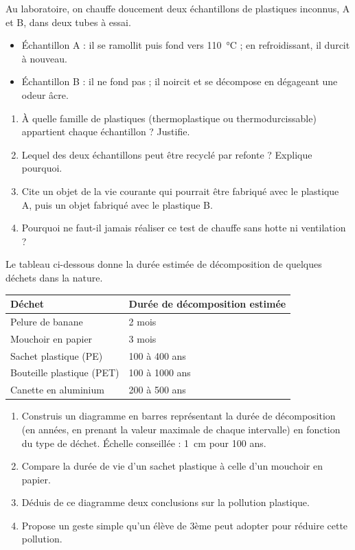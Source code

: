 \documentclass[11pt]{article}
\begin{document}
\begin{exercice}
Au laboratoire, on chauffe doucement deux échantillons de plastiques inconnus, A et B, dans deux tubes à essai.
\begin{itemize}
\item Échantillon A : il se ramollit puis fond vers \SI{110}{\celsius} ; en refroidissant, il durcit à nouveau.
\item Échantillon B : il ne fond pas ; il noircit et se décompose en dégageant une odeur âcre.
\end{itemize}
\begin{enumerate}
\item À quelle famille de plastiques (thermoplastique ou thermodurcissable) appartient chaque échantillon ? Justifie.
\item Lequel des deux échantillons peut être recyclé par refonte ? Explique pourquoi.
\item Cite un objet de la vie courante qui pourrait être fabriqué avec le plastique A, puis un objet fabriqué avec le plastique B.
\item Pourquoi ne faut-il jamais réaliser ce test de chauffe sans hotte ni ventilation ?
\end{enumerate}
\end{exercice}

\begin{exercice}
Le tableau ci-dessous donne la durée estimée de décomposition de quelques déchets dans la nature.

\begin{center}
\begin{tabularx}{\linewidth}{|l|X|}
\hline
\rowcolor{popblueL} \textbf{Déchet} & \textbf{Durée de décomposition estimée} \\
\hline
Pelure de banane & 2 mois \\
\hline
Mouchoir en papier & 3 mois \\
\hline
Sachet plastique (PE) & 100 à 400 ans \\
\hline
Bouteille plastique (PET) & 100 à 1000 ans \\
\hline
Canette en aluminium & 200 à 500 ans \\
\hline
\end{tabularx}
\end{center}

\begin{enumerate}
\item Construis un diagramme en barres représentant la durée de décomposition (en années, en prenant la valeur maximale de chaque intervalle) en fonction du type de déchet. Échelle conseillée : \SI{1}{cm} pour 100 ans.
\item Compare la durée de vie d'un sachet plastique à celle d'un mouchoir en papier.
\item Déduis de ce diagramme deux conclusions sur la pollution plastique.
\item Propose un geste simple qu'un élève de 3ème peut adopter pour réduire cette pollution.
\end{enumerate}
\end{exercice}
\end{document}
